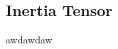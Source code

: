 \documentclass[class=report, 12pt, crop=false]{standalone}
\begin{document}
\begin{center}
\section{Inertia Tensor}
\begin{comment}
\end{comment}
awdawdaw
\end{center}
\end{document}
